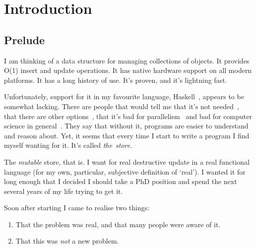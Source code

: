\chapter{Introduction}
\vspace{-2em}

\section{Prelude}

I am thinking of a data structure for managing collections of objects. It provides O(1) insert and update operations. It has native hardware support on all modern platforms. It has a long history of use. It's proven, and it's lightning fast.

Unfortunately, support for it in my favourite language, Haskell~\cite{haskell98-report}, appears to be somewhat lacking. There are people that would tell me that it's not needed~\cite{peyton-jones:ifp}, that there are other options~\cite{okasaki:pure-data}, that it's bad for parallelism~\cite{cann:retire-fortran} and bad for computer science in general~\cite{backus:liberate}. They say that without it, programs are easier to understand and reason about. Yet, it seems that every time I start to write a program I find myself wanting for it. It's called \emph{the~store}.

The \emph{mutable} store, that is. I want for real destructive update in a real functional language (for my own, particular,  subjective definition of `real'). I wanted it for long enough that I decided I should take a PhD position and spend the next several  years of my life trying to get it. 

Soon after starting I came to realise two things:
\begin{enumerate}[1)]
\item That the problem was real, and that many people were aware of it.
\item That this was \emph{not} a new problem.
\end{enumerate}















